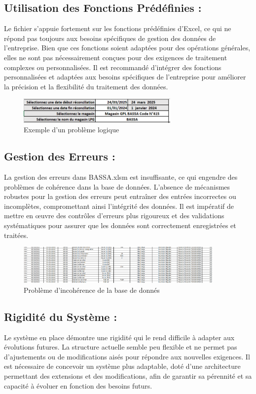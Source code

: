 \documentclass[a4paper, oneside, 12pt, final]{extreport}
\begin{document}
\subsection{Utilisation des Fonctions Prédéfinies :}
Le fichier s'appuie fortement sur les fonctions prédéfinies d'Excel, ce qui ne répond pas toujours aux besoins spécifiques de gestion des données de l'entreprise. Bien que ces fonctions soient adaptées pour des opérations générales, elles ne sont pas nécessairement conçues pour des exigences de traitement complexes ou personnalisées. Il est recommandé d'intégrer des fonctions personnalisées et adaptées aux besoins spécifiques de l'entreprise pour améliorer la précision et la flexibilité du traitement des données.
\begin{figure}[h]
    \centering
    \includegraphics[width=0.7\textwidth]{Capture4.png} %
    \caption{Exemple d'un problème logique}
    \label{Exemple d'un problème logique}
\end{figure}

\subsection{Gestion des Erreurs :}
La gestion des erreurs dans BASSA.xlsm est insuffisante, ce qui engendre des problèmes de cohérence dans la base de données. L'absence de mécanismes robustes pour la gestion des erreurs peut entraîner des entrées incorrectes ou incomplètes, compromettant ainsi l'intégrité des données. Il est impératif de mettre en œuvre des contrôles d'erreurs plus rigoureux et des validations systématiques pour assurer que les données sont correctement enregistrées et traitées.
\begin{figure}[h]
    \centering
    \includegraphics[width=0.9\textwidth]{Capture3.png} %
    \caption{Problème d'incohérence de la base de donnés}
    \label{fig:Problème d'incohérence de la base de donnés}
\end{figure}

\subsection{Rigidité du Système :}
Le système en place démontre une rigidité qui le rend difficile à adapter aux évolutions futures. La structure actuelle semble peu flexible et ne permet pas d'ajustements ou de modifications aisés pour répondre aux nouvelles exigences. Il est nécessaire de concevoir un système plus adaptable, doté d'une architecture permettant des extensions et des modifications, afin de garantir sa pérennité et sa capacité à évoluer en fonction des besoins futurs.
\end{document}
